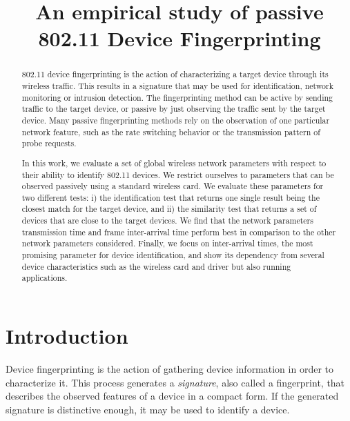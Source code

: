 \documentclass[10pt, conference, compsocconf, letterpaper]{IEEEtran}
\begin{document}
\title{An empirical study of passive 802.11 Device Fingerprinting}


\author{

}


\maketitle
\begin{abstract}
802.11 device fingerprinting is the action of characterizing a target device through its wireless traffic. This results in a signature that may be used for identification, network monitoring or intrusion detection.
The fingerprinting method can be active by sending traffic to the target device, or passive by just observing the traffic sent by the target device.
Many passive fingerprinting methods rely on the observation of one particular network feature, such as the rate switching behavior or the transmission pattern of probe requests.

In this work, we evaluate a set of global wireless network parameters with respect to their ability to identify 802.11 devices. We restrict ourselves to parameters that can be observed passively using a standard wireless card.
We evaluate these parameters for two different tests: i) the identification test that returns one single result being the closest match for the target device, and ii) the similarity test that returns a set of devices that are close to the target devices.
We find that the network parameters transmission time and frame inter-arrival time perform best in comparison to the other network parameters considered.
Finally, we focus on inter-arrival times, the most promising parameter for device identification, and show its dependency from several device characteristics such as the wireless card and driver but also running applications.
\end{abstract}



\section{Introduction}
Device fingerprinting is the action of gathering device information in order to characterize it.
This process generates a {\em signature}, also called a fingerprint, that describes the observed features of a device
in a compact form. If the generated signature is distinctive enough, it may be used to identify a device.
\end{document}
